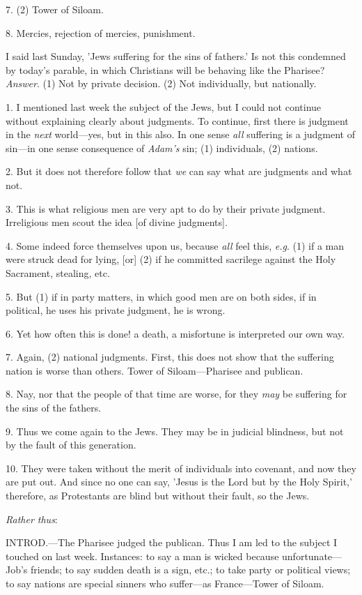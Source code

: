 7. (2) Tower of Siloam.

8. Mercies, rejection of mercies, punishment.


I said last Sunday, 'Jews suffering for the sins
of fathers.' Is not this condemned by today's parable, in which
Christians will be behaving like the Pharisee? \emph{Answer}. (1) Not
by private decision. (2) Not individually, but nationally.

1. I mentioned last week the subject of the Jews,
but I could not continue without explaining clearly about judgments.
To continue, first there is judgment in the \emph{next} world—yes,
but in this also. In one sense \emph{all} suffering is a judgment of
sin—in one sense consequence of \emph{Adam's} sin; (1) individuals,
(2) nations.

2. But it does not therefore follow that \emph{we}
can say what are judgments and what not.

3. This is what religious men are very apt to do
by their private judgment. Irreligious men scout the idea [of divine
judgments].

4. Some indeed force themselves upon us, because \emph{all}
feel this, \emph{e.g}. (1) if a man were struck dead for lying, [or]
(2) if he committed sacrilege against the Holy Sacrament, stealing,
etc.

5. But (1) if in party matters, in which good men
are on both sides, if in political, he uses his private judgment, he
is wrong.

6. Yet how often this is done! a death, a
misfortune is interpreted our own way.

7. Again, (2) national judgments. First, this
does not show that the suffering nation is worse than others. Tower of
Siloam—Pharisee and publican.

8. Nay, nor that the people of that time are
worse, for they \emph{may} be suffering for the sins of the fathers.

9. Thus we come again to the Jews. They may be in
judicial blindness, but not by the fault of this generation.

10. They were taken without the merit of
individuals into covenant, and now they are put out. And since no one
can say, 'Jesus is the Lord but by the Holy Spirit,' therefore, as
Protestants are blind but without their fault, so the Jews.

\emph{Rather thus}:

INTROD.—The
Pharisee judged the publican. Thus I am led to the subject I touched
on last week. Instances: to say a man is wicked because
unfortunate—Job's friends; to say sudden death is a sign, etc.; to
take party or political views; to say nations are special
sinners who suffer—as France—Tower of Siloam.

